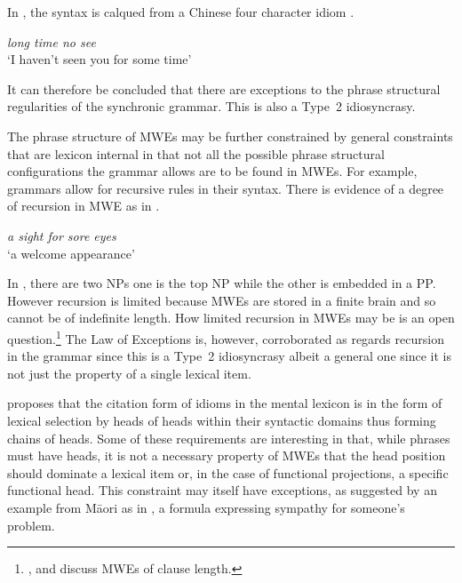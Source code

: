 \documentclass[output=paper]{langsci/langscibook}
\begin{document}
In , the syntax is calqued from a Chinese four character idiom \citep{rohtua}.

\begin{exe}
\ex\label{ex:ex27} \textit{long time no see}\\
‘I haven’t seen you for some time’ 
\end{exe}

\noindent
 It can therefore be concluded that there are exceptions to the phrase structural regularities of the synchronic grammar. This is also a Type~2 idiosyncrasy.


The phrase structure of MWEs may be further constrained by general constraints that are lexicon internal in that not all the possible phrase structural configurations the grammar allows are to be found in MWEs. For example, grammars allow for recursive rules in their syntax. There is evidence of a degree of recursion in MWE as in .

\begin{exe}
\ex\label{ex:ex28} \textit{a sight for sore eyes}\\
‘a welcome appearance’ 
\end{exe}



In , there are two NPs one is the top NP while the other is embedded in a PP. However recursion is limited because MWEs are stored in a finite brain and so cannot be of indefinite length. How limited recursion in MWEs may be is an open question.\footnote{\cite{Hoeksema:10idiom}, and \cite{Richter:Sailer:09}
 discuss MWEs of clause length.} The Law of Exceptions is, however, corroborated as regards recursion in the grammar since this is a Type~2 idiosyncrasy albeit a general one since it is not just the property of a single lexical item.

\citet{OGrady:98} proposes that the citation form of idioms in the mental lexicon is in the form of lexical selection by heads of heads within their syntactic domains thus forming chains of heads. Some of these requirements are interesting in that, while phrases must have heads, it is not a necessary property of MWEs that the head position should dominate a lexical item or, in the case of functional projections, a specific functional head. This constraint may itself have exceptions, as suggested by an example from M\=aori as in , 
a formula expressing sympathy for someone's problem.
\end{document}
